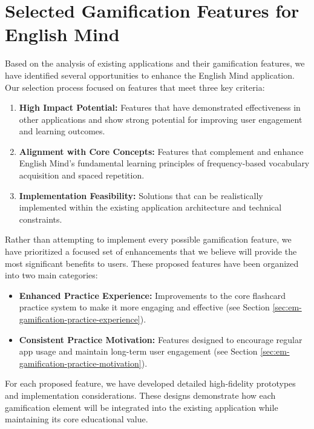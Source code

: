 \chapter{Selected Gamification Features for English Mind}

Based on the analysis of existing applications and their gamification features, we have identified several opportunities to enhance the English Mind application. Our selection process focused on features that meet three key criteria:

\begin{enumerate}
    \item \textbf{High Impact Potential:} Features that have demonstrated effectiveness in other applications and show strong potential for improving user engagement and learning outcomes.
    
    \item \textbf{Alignment with Core Concepts:} Features that complement and enhance English Mind's fundamental learning principles of frequency-based vocabulary acquisition and spaced repetition.
    
    \item \textbf{Implementation Feasibility:} Solutions that can be realistically implemented within the existing application architecture and technical constraints.
\end{enumerate}

Rather than attempting to implement every possible gamification feature, we have prioritized a focused set of enhancements that we believe will provide the most significant benefits to users. These proposed features have been organized into two main categories:

\begin{itemize}
    \item \textbf{Enhanced Practice Experience:} Improvements to the core flashcard practice system to make it more engaging and effective (see Section \ref{sec:em-gamification-practice-experience}).
    
    \item \textbf{Consistent Practice Motivation:} Features designed to encourage regular app usage and maintain long-term user engagement (see Section \ref{sec:em-gamification-practice-motivation}).
\end{itemize}

For each proposed feature, we have developed detailed high-fidelity prototypes and implementation considerations. These designs demonstrate how each gamification element will be integrated into the existing application while maintaining its core educational value.

